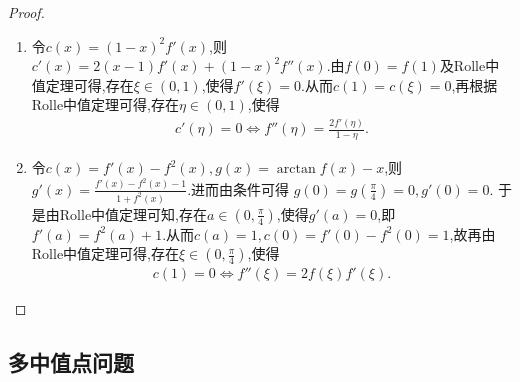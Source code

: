 \documentclass[../../main.tex]{subfiles}%
\begin{document}
\begin{proof}
\begin{enumerate}
\item 令\(c(x)=(1 - x)^2f'(x)\),则\(c'(x)=2(x - 1)f'(x)+(1 - x)^2f''(x)\).由\(f(0)=f(1)\)及Rolle中值定理可得,存在\(\xi\in(0,1)\),使得\(f'(\xi)=0\).从而\(c(1)=c(\xi)=0\),再根据Rolle中值定理可得,存在\(\eta\in(0,1)\),使得
\begin{align*}
c'(\eta)=0\Leftrightarrow f''(\eta)=\frac{2f'(\eta)}{1 - \eta}.
\end{align*} 

\item 令\(c(x)=f'(x)-f^{2}(x),g(x)=\arctan f(x)-x\),则\(g'(x)=\frac{f'(x)-f^{2}(x)-1}{1 + f^{2}(x)}\).进而由条件可得
\(g(0)=g(\frac{\pi}{4}) = 0,g'(0)=0\).
于是由Rolle中值定理可知,存在\(a\in(0,\frac{\pi}{4})\),使得\(g'(a)=0\),即\(f'(a)=f^{2}(a)+1\).从而\(c(a)=1,c(0)=f'(0)-f^{2}(0)=1\),故再由Rolle中值定理可得,存在\(\xi\in(0,\frac{\pi}{4})\),使得
\begin{align*}
c(1)=0\Leftrightarrow f''(\xi)=2f(\xi)f'(\xi).
\end{align*} 
\end{enumerate}
\end{proof}

\subsection{多中值点问题}
\end{document}
